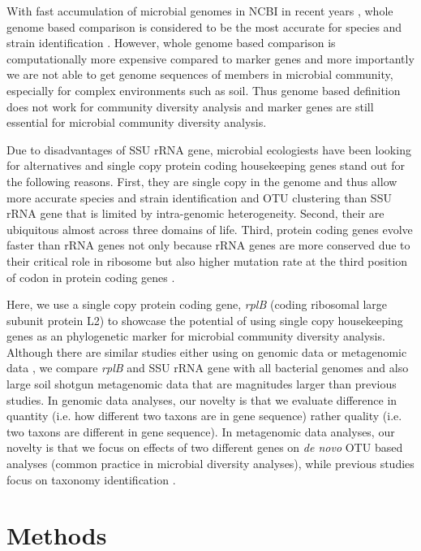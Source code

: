\documentclass[]{msu-thesis}
\begin{document}
With fast accumulation of microbial genomes in NCBI in recent years \cite{land_insights_2015}, whole genome based comparison is considered to be the most accurate for species and strain identification \cite{goris_dna-dna_2007,luo_genome_2011,varghese_microbial_2015}. However, whole genome based comparison is computationally more expensive compared to marker genes and more importantly we are not able to get genome sequences of members in microbial community, especially for complex environments such as soil. Thus genome based definition does not work for community diversity analysis and marker genes are still essential for microbial community diversity analysis.

Due to disadvantages of SSU rRNA gene, microbial ecologiests have been looking for alternatives and single copy protein coding housekeeping genes stand out for the following reasons. First, they are single copy in the genome and thus allow more accurate species and strain identification and OTU clustering than SSU rRNA gene that is limited by intra-genomic heterogeneity. Second, their are ubiquitous almost across three domains of life. Third, protein coding genes evolve faster than rRNA genes not only because rRNA genes are more conserved due to their critical role in ribosome \cite{carter_functional_2000} but also higher mutation rate at the third position of codon in protein coding genes \cite{case_use_2007}.

Here, we use a single copy protein coding gene, \textit{rplB} (coding ribosomal large subunit protein L2) to showcase the potential of using single copy housekeeping genes as an phylogenetic marker for microbial community diversity analysis. Although there are similar studies either using on genomic data or metagenomic data \cite{case_use_2007,roux_comparison_2011}, we compare \textit{rplB} and SSU rRNA gene with all bacterial genomes and also large soil shotgun metagenomic data that are magnitudes larger than previous studies. In genomic data analyses, our novelty is that we evaluate difference in quantity (i.e. how different two taxons are in gene sequence) rather quality (i.e. two taxons are different in gene sequence). In metagenomic data analyses, our novelty is that we focus on effects of two different genes on \textit{de novo} OTU based analyses (common practice in microbial diversity analyses), while previous studies focus on taxonomy identification \cite{case_use_2007,roux_comparison_2011}. 

\section{Methods}
\end{document}
